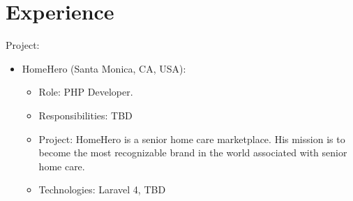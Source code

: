 \documentclass[11pt,a4paper,sans]{moderncv}        %
\begin{document}
\section{Experience}
  {
    Project:\\
    \begin{itemize}
      \item HomeHero (Santa Monica, CA, USA):
        \begin{itemize}
          \item Role: PHP Developer.
          \item Responsibilities: TBD
          \item Project: HomeHero is a senior home care marketplace. His mission is to become the most recognizable brand in the world associated with senior home care.
          \item Technologies: Laravel 4, TBD
        \end{itemize}
    \end{itemize}
  }
\end{document}
